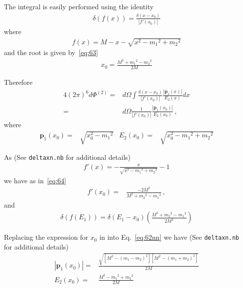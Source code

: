 The integral is easily performed using the identity
\begin{align}
   \delta\left(f(x)\right)=\frac{\delta(x-x_0)}{|f'(x_0)|}
\end{align}
where
\begin{align}
  f(x)=M-x-\sqrt{x^2-{m_1}^2+{m_2}^2}
\end{align}
and the root is given by~\eqref{eq:63}
\begin{align}
  x_0=\frac{M^2+{m_1}^2-{m_2}^2}{2M}
\end{align}

Therefore
\begin{align}
  \label{eq:61nn}
   4(2\pi)^6d\Phi^{(2)}=&d\Omega\int\frac{\delta(x-x_0)}{|f'(x_0)|}\frac{
     |\mathbf{p}_1(x)|}{E_2(x)}dx\nonumber\\
   =&d\Omega\frac{1}{|f'(x_0)|}\frac{
     |\mathbf{p}_1(x_0)|}{E_2(x_0)}\,,
\end{align}
where 
\begin{align}
  \label{eq:62nn}
  \mathbf{p}_1(x_0)=&\sqrt{x_0^2-{m_1}^2}&
  E_2(x_0)=&\sqrt{x_0^2-{m_1}^2+{m_2}^2}
\end{align}

As (See 
\texttt{deltaxn.nb} %
for additional details)
\begin{align}
  f'(x)=-\frac{x}{\sqrt{x^2-{m_1}^2+{m_2}^2}}-1
\end{align}
we have as in~\eqref{eq:64}
\begin{align}
  \label{eq:64nn}
  f'(x_0)=&\frac{-2M^2}{M^2+{m_2}^2-{m_1}^2}\,,
\end{align}
and
\begin{align}
  \label{eq:65nn}
  \delta(f(E_1))=\delta(E_1-x_0)\left(\frac{M^2+{m_2}^2-{m_1}^2}{2M^2}\right)
\end{align}

Replacing the expression for $x_0$ in into Eq.~\eqref{eq:62nn} we have (See 
\texttt{deltaxn.nb}  %
for additional details)
\begin{align}
  \label{eq:66nn}
  |\mathbf{p}_1(x_0)|=&\frac{\sqrt{[M^2-({m_1}-{m_2})^2][M^2-({m_1}+{m_2})^2]}}{2M}\nonumber\\
E_2(x_0)=&  \frac{M^2-{m_1}^2+{m_2}^2}{2M}
\end{align}

